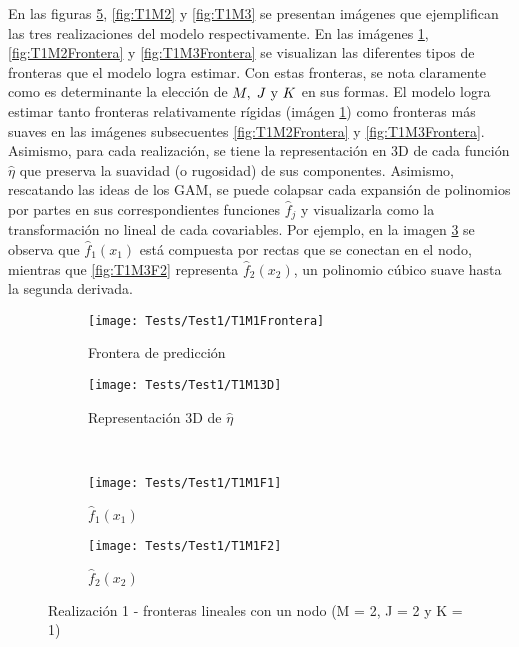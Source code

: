 \documentclass[../Main/Main.tex]{subfiles}
\begin{document}
En las figuras \ref{fig:T1M1}, \ref{fig:T1M2} y \ref{fig:T1M3} se presentan imágenes que ejemplifican las tres realizaciones del modelo respectivamente. En las imágenes \ref{fig:T1M1Frontera}, \ref{fig:T1M2Frontera} y \ref{fig:T1M3Frontera} se visualizan las diferentes tipos de fronteras que el modelo logra estimar. Con estas fronteras, se nota claramente como es determinante la elección de $M,\;J\text{ y }K$ en sus formas. El modelo logra estimar tanto fronteras relativamente rígidas (imágen \ref{fig:T1M1Frontera}) como fronteras más suaves en las imágenes subsecuentes \ref{fig:T1M2Frontera} y \ref{fig:T1M3Frontera}. Asimismo, para cada realización, se tiene la representación en 3D de cada función $\hat{\eta}$ que preserva la suavidad (o rugosidad) de sus componentes. Asimismo, rescatando las ideas de los GAM, se puede colapsar cada expansión de polinomios por partes en sus correspondientes funciones $\hat{f}_j$ y visualizarla como la transformación no lineal de cada covariables. Por ejemplo, en la imagen \ref{fig:T1M1F1} se observa que $\hat{f}_1(x_1)$ está compuesta por rectas que se conectan en el nodo, mientras que \ref{fig:T1M3F2} representa $\hat{f}_2(x_2)$, un polinomio cúbico suave hasta la segunda derivada.  

\begin{figure}[p]
	\centering
	\begin{subfigure}[b]{0.45\textwidth}
    	\texttt{[image: Tests/Test1/T1M1Frontera]}
		\caption{Frontera de predicción}
		\label{fig:T1M1Frontera}
	\end{subfigure}
	\hfill    
    \begin{subfigure}[b]{0.45\textwidth}
        \texttt{[image: Tests/Test1/T1M13D]}
        \caption{Representación 3D de $\hat{\eta}$}
        \label{fig:T1M13D}
    \end{subfigure}
    \\[3pt]
    \begin{subfigure}[b]{0.45\textwidth}
    	\texttt{[image: Tests/Test1/T1M1F1]}
		\caption{$\hat{f}_1(x_1)$}
		\label{fig:T1M1F1}
	\end{subfigure}
	\hfill    
    \begin{subfigure}[b]{0.45\textwidth}
        \texttt{[image: Tests/Test1/T1M1F2]}
        \caption{$\hat{f}_2(x_2)$}
        \label{fig:T1M1F2}
    \end{subfigure}
    \caption{Realización 1 - fronteras lineales con un nodo (M = 2, J = 2 y K = 1)}
    \label{fig:T1M1}
\end{figure}
\end{document}
